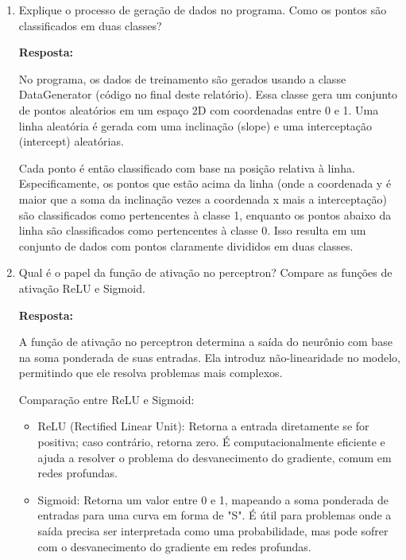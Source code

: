 \documentclass[12 pt]{article}
\begin{document}
\begin{enumerate}
    \item Explique o processo de geração de dados no programa. Como os pontos são classificados em duas classes? \par

    \textbf{Resposta:} \par

    No programa, os dados de treinamento são gerados usando a classe DataGenerator (código no final deste relatório). Essa classe gera um conjunto de pontos aleatórios em um espaço 2D com coordenadas entre 0 e 1. Uma linha aleatória é gerada com uma inclinação (slope) e uma interceptação (intercept) aleatórias.

    Cada ponto é então classificado com base na posição relativa à linha. Especificamente, os pontos que estão acima da linha (onde a coordenada y é maior que a soma da inclinação vezes a coordenada x mais a interceptação) são classificados como pertencentes à classe 1, enquanto os pontos abaixo da linha são classificados como pertencentes à classe 0. Isso resulta em um conjunto de dados com pontos claramente divididos em duas classes.
    
    \item Qual é o papel da função de ativação no perceptron? Compare as funções de ativação ReLU e Sigmoid.\par

    \textbf{Resposta:} \par

    A função de ativação no perceptron determina a saída do neurônio com base na soma ponderada de suas entradas. Ela introduz não-linearidade no modelo, permitindo que ele resolva problemas mais complexos.

    Comparação entre ReLU e Sigmoid:

    \begin{itemize}
        \item ReLU (Rectified Linear Unit): Retorna a entrada diretamente se for positiva; caso contrário, retorna zero. É computacionalmente eficiente e ajuda a resolver o problema do desvanecimento do gradiente, comum em redes profundas.
        \item Sigmoid: Retorna um valor entre 0 e 1, mapeando a soma ponderada de entradas para uma curva em forma de "S". É útil para problemas onde a saída precisa ser interpretada como uma probabilidade, mas pode sofrer com o desvanecimento do gradiente em redes profundas.
    \end{itemize}
    

\end{enumerate}
\end{document}
